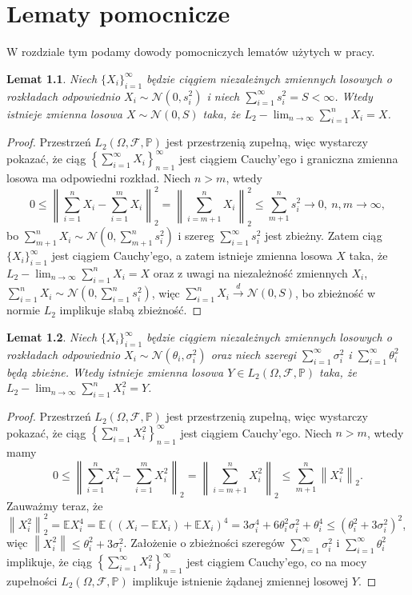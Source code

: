 \documentclass[man,mfiu]{mgrwms}
\newcommand{\norm}[1]{\left\lVert#1\right\rVert}
\newtheorem{lm}{Lemat}[chapter]
\begin{document}
\chapter{Lematy pomocnicze}\label{lematy}
W rozdziale tym podamy dowody pomocniczych lematów użytych w pracy.
\begin{lm}\label{pierwsza}
Niech $\{X_i\}_{i=1}^{\infty}$ będzie ciągiem niezależnych zmiennych losowych o rozkładach odpowiednio $X_i\sim \mathcal{N}(0,s_i^2)$ i niech $\sum_{i=1}^{\infty}s_i^2=S<\infty$. Wtedy istnieje zmienna losowa $X\sim\mathcal{N}(0,S)$ taka, że $L_2- \lim_{n\to \infty}\sum_{i=1}^nX_i=X$.
\end{lm}
\begin{proof}
Przestrzeń $L_2(\Omega,\mathcal{F},\mathbb{P})$ jest przestrzenią zupełną, więc wystarczy pokazać, że ciąg $\left\{\sum_{i=1}^{\infty}X_i\right\}_{n=1}^{\infty}$ jest ciągiem Cauchy'ego i graniczna zmienna losowa ma odpowiedni rozkład. Niech $n>m$, wtedy
\begin{displaymath}
0\leq \norm{\sum_{i=1}^{n}X_i-\sum_{i=1}^{m}X_i}_2^2=\norm{\sum_{i=m+1}^{n}X_i}_2^2\leq \sum_{m+1}^ns_i^2\to 0,\ n,m\to \infty,
\end{displaymath}
bo $\sum_{m+1}^nX_i\sim \mathcal{N}\left(0,\sum_{m+1}^ns_i^2\right)$ i szereg $\sum_{i=1}^{\infty}s_i^2$ jest zbieżny. Zatem ciąg $\{X_i\}_{i=1}^{\infty}$ jest ciągiem Cauchy'ego, a zatem istnieje zmienna losowa $X$ taka, że $L_2- \lim_{n\to \infty}\sum_{i=1}^nX_i=X$ oraz z uwagi na niezależność zmiennych $X_i$, $\sum_{i=1}^nX_i\sim\mathcal{N}(0,\sum_{i=1}^ns_i^2)$, więc $\sum_{i=1}^nX_i\stackrel{d}{\to}\mathcal{N}\left(0,S\right)$, bo zbieżność w normie $L_2$ implikuje słabą zbieżność.
\end{proof}
\begin{lm}\label{druga}
Niech $\{X_i\}_{i=1}^{\infty}$ będzie ciągiem niezależnych zmiennych losowych o rozkładach odpowiednio $X_i\sim \mathcal{N}(\theta_i,\sigma_i^2)$ oraz niech szeregi $\sum_{i=1}^{\infty}\sigma_i^2$ i $\sum_{i=1}^{\infty}\theta_i^2$ będą zbieżne. Wtedy istnieje zmienna losowa $Y\in L_2(\Omega,\mathcal{F},\mathbb{P})$ taka, że $L_2- \lim_{n\to \infty}\sum_{i=1}^nX_i^2=Y$.
\end{lm}
\begin{proof}
Przestrzeń $L_2(\Omega,\mathcal{F},\mathbb{P})$ jest przestrzenią zupełną, więc wystarczy pokazać, że ciąg $\left\{\sum_{i=1}^{n}X_i^2\right\}_{n=1}^{\infty}$ jest ciągiem Cauchy'ego. Niech $n>m$, wtedy mamy
\begin{displaymath}
0\leq \norm{\sum_{i=1}^{n}X_i^2-\sum_{i=1}^{m}X_i^2}_2=\norm{\sum_{i=m+1}^{n}X_i^2}_2\leq \sum_{m+1}^n\norm{X_i^2}_2.
\end{displaymath}
Zauważmy teraz, że $\norm{X_i^2}_2^2=\mathbb{E}X_i^4=\mathbb{E}\left((X_i-\mathbb{E}X_i)+\mathbb{E}X_i\right)^4=3\sigma_i^4+6\theta_i^2\sigma_i^2+\theta_i^4\leq (\theta_i^2+3\sigma_i^2)^2$, więc $\norm{X_i^2}\leq \theta_i^2+3\sigma_i^2$. Założenie o zbieżności szeregów $\sum_{i=1}^{\infty}\sigma_i^2$ i $\sum_{i=1}^{\infty}\theta_i^2$ implikuje, że ciąg $\left\{\sum_{i=1}^{\infty}X_i^2\right\}_{n=1}^{\infty}$ jest ciągiem Cauchy'ego, co na mocy zupełności $L_2(\Omega,\mathcal{F},\mathbb{P})$ implikuje istnienie żądanej zmiennej losowej $Y$.
\end{proof}
\end{document}
